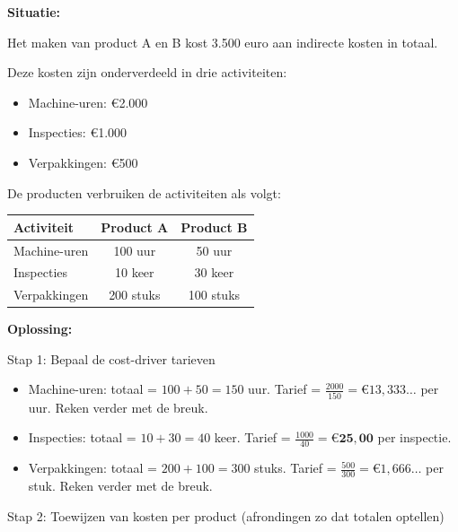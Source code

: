 \documentclass[a4paper,11pt]{article}
\begin{document}
\begin{oefenblok}
    \textbf{Situatie:}

    Het maken van product A en B kost 3.500 euro aan indirecte kosten in totaal.

    Deze kosten zijn onderverdeeld in drie activiteiten:
    \begin{itemize}
        \item Machine-uren: €2.000
        \item Inspecties: €1.000
        \item Verpakkingen: €500
    \end{itemize}

    De producten verbruiken de activiteiten als volgt:

    \begin{tabular}{lcc}
        \hline
        \textbf{Activiteit} & \textbf{Product A} & \textbf{Product B} \\
        \hline
        Machine-uren        & 100 uur            & 50 uur             \\
        Inspecties          & 10 keer            & 30 keer            \\
        Verpakkingen        & 200 stuks          & 100 stuks          \\
        \hline
    \end{tabular}

    \vspace{4mm}
    \textbf{Oplossing:}

    Stap 1: Bepaal de cost-driver tarieven
    \begin{itemize}
        \item Machine-uren: totaal = $100 + 50 = 150$ uur. Tarief = $\frac{2000}{150} = €13{,}333\ldots$ per uur. Reken verder met de breuk.
        \item Inspecties: totaal = $10 + 30 = 40$ keer. Tarief = $\frac{1000}{40} = \mathbf{€25{,}00}$ per inspectie.
        \item Verpakkingen: totaal = $200 + 100 = 300$ stuks. Tarief = $\frac{500}{300} = €1{,}666\ldots$ per stuk. Reken verder met de breuk.
    \end{itemize}

    Stap 2: Toewijzen van kosten per product (afrondingen zo dat totalen optellen)


\end{oefenblok}
\end{document}
